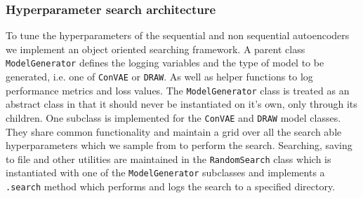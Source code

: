 \subsubsection{Hyperparameter search architecture}\label{sec:hyperparam_search_arch}

To tune the hyperparameters of the sequential and non sequential autoencoders we implement an object oriented searching framework. A parent class \lstinline{ModelGenerator} defines the logging variables and the type of model to be generated, i.e. one of \lstinline{ConVAE} or \lstinline{DRAW}. As well as helper functions to log performance metrics and loss values. The \lstinline{ModelGenerator} class is treated as an abstract class in that it should never be instantiated on it's own, only through its children. One subclass is implemented for the \lstinline{ConVAE} and \lstinline{DRAW} model classes. They share common functionality and maintain a grid over all the search able hyperparameters which we sample from to perform the search. Searching, saving to file and other utilities are maintained in the \lstinline{RandomSearch} class which is instantiated with one of the \lstinline{ModelGenerator} subclasses and implements a \lstinline{.search} method which performs and logs the search to a specified directory. 